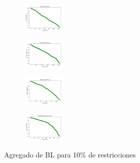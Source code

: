 \begin{figure}[H]
\begin{subfigure}
        \centering
        \includegraphics[width=0.234\textwidth]{img/bl/iris_set_const_10_3773969821_cost.png}
    \end{subfigure}
    \hfill
    \begin{subfigure}
        \centering
        \includegraphics[width=0.234\textwidth]{img/bl/ecoli_set_const_10_3773969821_cost.png}
    \end{subfigure}
    \hfill
    \begin{subfigure}
        \centering
        \includegraphics[width=0.234\textwidth]{img/bl/rand_set_const_10_3773969821_cost.png}
    \end{subfigure}
    \hfill
    \begin{subfigure}
        \centering
        \includegraphics[width=0.234\textwidth]{img/bl/newthyroid_set_const_10_3773969821_cost.png}
    \end{subfigure}
    \caption{Agregado de BL para 10\% de restricciones}
\end{figure}

\vspace*{\fill}
\newpage
\vspace*{\fill}

